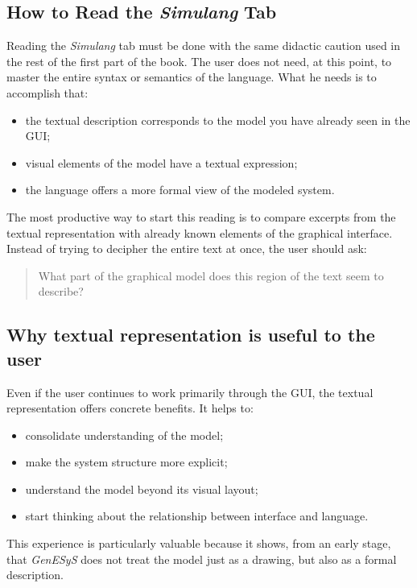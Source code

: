 \subsection{How to Read the \textit{Simulang} Tab}
\label{subsec:cap5_como_ler_simulang}

Reading the \textit{Simulang} tab must be done with the same didactic caution used in the rest of the first part of the book. The user does not need, at this point, to master the entire syntax or semantics of the language. What he needs is to accomplish that:
\begin{itemize}
\item the textual description corresponds to the model you have already seen in the GUI;
\item visual elements of the model have a textual expression;
\item the language offers a more formal view of the modeled system.
\end{itemize}

The most productive way to start this reading is to compare excerpts from the textual representation with already known elements of the graphical interface. Instead of trying to decipher the entire text at once, the user should ask:
\begin{quote}
What part of the graphical model does this region of the text seem to describe?
\end{quote}

\subsection{Why textual representation is useful to the user}
\label{subsec:cap5_por_que_simulang_util_ao_usuario}

Even if the user continues to work primarily through the GUI, the textual representation offers concrete benefits. It helps to:
\begin{itemize}
\item consolidate understanding of the model;
\item make the system structure more explicit;
\item understand the model beyond its visual layout;
\item start thinking about the relationship between interface and language.
\end{itemize}

This experience is particularly valuable because it shows, from an early stage, that \textit{GenESyS} does not treat the model just as a drawing, but also as a formal description.

